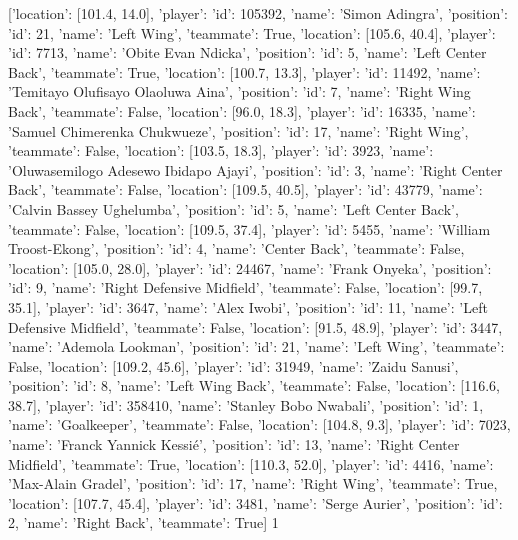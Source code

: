 [{'location': [101.4, 14.0], 'player': {'id': 105392, 'name': 'Simon Adingra'}, 'position': {'id': 21, 'name': 'Left Wing'}, 'teammate': True}, {'location': [105.6, 40.4], 'player': {'id': 7713, 'name': 'Obite Evan Ndicka'}, 'position': {'id': 5, 'name': 'Left Center Back'}, 'teammate': True}, {'location': [100.7, 13.3], 'player': {'id': 11492, 'name': 'Temitayo Olufisayo Olaoluwa Aina'}, 'position': {'id': 7, 'name': 'Right Wing Back'}, 'teammate': False}, {'location': [96.0, 18.3], 'player': {'id': 16335, 'name': 'Samuel Chimerenka Chukwueze'}, 'position': {'id': 17, 'name': 'Right Wing'}, 'teammate': False}, {'location': [103.5, 18.3], 'player': {'id': 3923, 'name': 'Oluwasemilogo Adesewo Ibidapo Ajayi'}, 'position': {'id': 3, 'name': 'Right Center Back'}, 'teammate': False}, {'location': [109.5, 40.5], 'player': {'id': 43779, 'name': 'Calvin Bassey Ughelumba'}, 'position': {'id': 5, 'name': 'Left Center Back'}, 'teammate': False}, {'location': [109.5, 37.4], 'player': {'id': 5455, 'name': 'William Troost-Ekong'}, 'position': {'id': 4, 'name': 'Center Back'}, 'teammate': False}, {'location': [105.0, 28.0], 'player': {'id': 24467, 'name': 'Frank Onyeka'}, 'position': {'id': 9, 'name': 'Right Defensive Midfield'}, 'teammate': False}, {'location': [99.7, 35.1], 'player': {'id': 3647, 'name': 'Alex Iwobi'}, 'position': {'id': 11, 'name': 'Left Defensive Midfield'}, 'teammate': False}, {'location': [91.5, 48.9], 'player': {'id': 3447, 'name': 'Ademola Lookman'}, 'position': {'id': 21, 'name': 'Left Wing'}, 'teammate': False}, {'location': [109.2, 45.6], 'player': {'id': 31949, 'name': 'Zaidu Sanusi'}, 'position': {'id': 8, 'name': 'Left Wing Back'}, 'teammate': False}, {'location': [116.6, 38.7], 'player': {'id': 358410, 'name': 'Stanley Bobo Nwabali'}, 'position': {'id': 1, 'name': 'Goalkeeper'}, 'teammate': False}, {'location': [104.8, 9.3], 'player': {'id': 7023, 'name': 'Franck Yannick Kessié'}, 'position': {'id': 13, 'name': 'Right Center Midfield'}, 'teammate': True}, {'location': [110.3, 52.0], 'player': {'id': 4416, 'name': 'Max-Alain Gradel'}, 'position': {'id': 17, 'name': 'Right Wing'}, 'teammate': True}, {'location': [107.7, 45.4], 'player': {'id': 3481, 'name': 'Serge Aurier'}, 'position': {'id': 2, 'name': 'Right Back'}, 'teammate': True}]                                                                                                                                                                                                                                                                                                                                                                                                                                                                                                                                                                                                                                                 1
